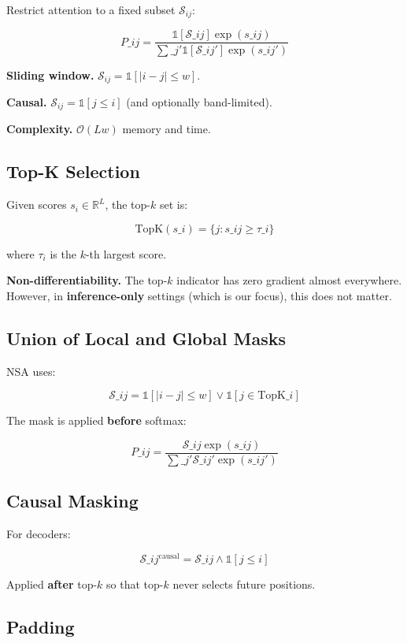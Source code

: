 Restrict attention to a fixed subset $\mathcal{S}_{ij}$:

\[
P\_{ij} = \frac{\mathbb{1}[\mathcal{S}\_{ij}] \exp(s\_{ij})}{\sum\_{j'} \mathbb{1}[\mathcal{S}\_{ij'}] \exp(s\_{ij'})}
\tag{3.2}
\]

\textbf{Sliding window.} $\mathcal{S}_{ij} = \mathbb{1}[|i - j| \leq w]$.

\textbf{Causal.} $\mathcal{S}_{ij} = \mathbb{1}[j \leq i]$ (and optionally band-limited).

\textbf{Complexity.} $\mathcal{O}(L w)$ memory and time.

\subsection{Top-K Selection}

Given scores $s_i \in \mathbb{R}^L$, the top-$k$ set is:

\[
\text{TopK}(s\_i) = \{j : s\_{ij} \geq \tau\_i\}
\tag{3.3}
\]

where $\tau_i$ is the $k$-th largest score.

\textbf{Non-differentiability.} The top-$k$ indicator has zero gradient almost 
everywhere. However, in \textbf{inference-only} settings (which is our focus), 
this does not matter.

\subsection{Union of Local and Global Masks}

NSA uses:

\[
\mathcal{S}\_{ij} = \mathbb{1}[|i - j| \leq w] \lor \mathbb{1}[j \in \text{TopK}\_i]
\tag{3.4}
\]

The mask is applied \textbf{before} softmax:

\[
P\_{ij} = \frac{\mathcal{S}\_{ij} \exp(s\_{ij})}{\sum\_{j'} \mathcal{S}\_{ij'} \exp(s\_{ij'})}
\tag{3.5}
\]

\subsection{Causal Masking}

For decoders:

\[
\mathcal{S}\_{ij}^\text{causal} = \mathcal{S}\_{ij} \land \mathbb{1}[j \leq i]
\tag{3.6}
\]

Applied \textbf{after} top-$k$ so that top-$k$ never selects future positions.

\subsection{Padding}

